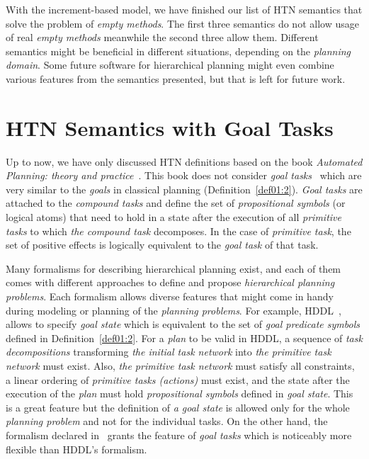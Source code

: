 \medskip\noindent
With the increment-based model, we have finished our list of HTN semantics that solve the problem of \emph{empty methods}. The first three semantics do not allow usage of real \emph{empty methods} meanwhile the second three allow them. Different semantics might be beneficial in different situations, depending on the \emph{planning domain}. Some future software for hierarchical planning might even combine various features from the semantics presented, but that is left for future work.
 
\section{{HTN} Semantics with Goal Tasks}

\medskip\noindent
Up to now, we have only discussed HTN definitions based on the book \emph{Automated Planning: theory and practice}~\cite{nau}. This book does not consider \emph{goal tasks}~\cite{complexity} which are very similar to the \emph{goals} in classical planning (Definition~\ref{def01:2}). \emph{Goal tasks} are attached to the \emph{compound tasks} and define the set of \emph{propositional symbols} (or logical atoms) that need to hold in a state after the execution of all \emph{primitive tasks} to which \emph{the compound task} decomposes. In the case of \emph{primitive task}, the set of positive effects is logically equivalent to the \emph{goal task} of that task. 

\medskip\noindent
Many formalisms for describing hierarchical planning exist, and each of them comes with different approaches to define and propose \emph{hierarchical planning problems}. Each formalism allows diverse features that might come in handy during modeling or planning of the \emph{planning problems}. For example, HDDL~\cite{hddl}, allows to specify \emph{goal state} which is equivalent to the set of \emph{goal predicate symbols} defined in Definition~\ref{def01:2}. For a \emph{plan} to be valid in HDDL, a sequence of \emph{task decompositions} transforming \emph{the initial task network} into \emph{the primitive task network} must exist. Also, \emph{the primitive task network} must satisfy all constraints, a linear ordering of \emph{primitive tasks (actions)} must exist, and the state after the execution of the \emph{plan} must hold \emph{propositional symbols} defined in \emph{goal state}. This is a great feature but the definition of \emph{a goal state} is allowed only for the whole \emph{planning problem} and not for the individual tasks. On the other hand, the formalism declared in~\cite{complexity} grants the feature of \emph{goal tasks} which is noticeably more flexible than HDDL's formalism.

